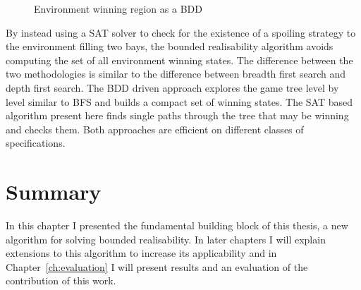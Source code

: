 \begin{figure}
    \centering
    \caption{Environment winning region as a BDD}
    \label{fig:strengthsexamplebdd}
\end{figure}

By instead using a SAT solver to check for the existence of a spoiling strategy to the environment filling two bays, the bounded realisability algorithm avoids computing the set of all environment winning states. The difference between the two methodologies is similar to the difference between breadth first search and depth first search. The BDD driven approach explores the game tree level by level similar to BFS and builds a compact set of winning states. The SAT based algorithm present here finds single paths through the tree that may be winning and checks them. Both approaches are efficient on different classes of specifications.

\section{Summary}

In this chapter I presented the fundamental building block of this thesis, a new algorithm for solving bounded realisability. In later chapters I will explain extensions to this algorithm to increase its applicability and in Chapter~\ref{ch:evaluation} I will present results and an evaluation of the contribution of this work.

